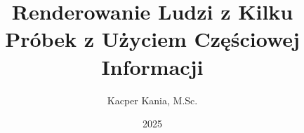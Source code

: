 \documentclass{diploma}
\title{Renderowanie Ludzi z Kilku Próbek z Użyciem Częściowej Informacji}
\author{Kacper Kania, M.Sc.}
\date{2025}
\begin{document}
    \frontpages




    
    \acronymslist
\end{document}
